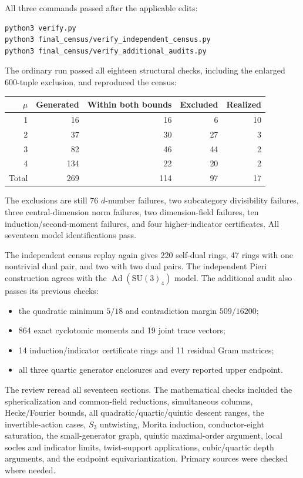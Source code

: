 \documentclass[11pt,a4paper]{article}
\begin{document}
All three commands passed after the applicable edits:
\begin{verbatim}
python3 verify.py
python3 final_census/verify_independent_census.py
python3 final_census/verify_additional_audits.py
\end{verbatim}
The ordinary run passed all eighteen structural checks, including
the enlarged 600-tuple exclusion, and reproduced the census:
\begin{center}
\begin{tabular}{rrrrr}
\toprule
$\mu$&Generated&Within both bounds&Excluded&Realized\\\midrule
1&16&16&6&10\\
2&37&30&27&3\\
3&82&46&44&2\\
4&134&22&20&2\\\midrule
Total&269&114&97&17\\\bottomrule
\end{tabular}
\end{center}
The exclusions are still 76 $d$-number failures, two subcategory
divisibility failures, three central-dimension norm failures, two
dimension-field failures, ten induction/second-moment failures,
and four higher-indicator certificates. All seventeen model
identifications pass.

The independent census replay again gives 220 self-dual rings,
47 rings with one nontrivial dual pair, and two with two dual pairs.
The independent Pieri construction agrees with the
$\operatorname{Ad}(\mathrm{SU}(3)_4)$ model.
The additional audit also passes its previous checks:
\begin{itemize}
\item the quadratic minimum $5/18$ and contradiction margin $509/16200$;
\item 864 exact cyclotomic moments and 19 joint trace vectors;
\item 14 induction/indicator certificate rings and 11 residual Gram matrices;
\item all three quartic generator enclosures and every reported upper endpoint.
\end{itemize}

The review reread all seventeen sections. The mathematical checks
included the sphericalization and common-field reductions, simultaneous
columns, Hecke/Fourier bounds, all quadratic/quartic/quintic descent
ranges, the invertible-action cases, $S_3$ untwisting, Morita induction,
conductor-eight saturation, the small-generator graph, quintic
maximal-order argument, local socles and indicator limits, twist-support
applications, cubic/quartic depth arguments, and the endpoint
equivariantization. Primary sources were checked where needed.
\end{document}

